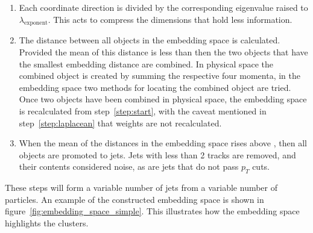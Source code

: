 \begin{enumerate}
    \item \label{step:compression} Each coordinate direction is divided by the corresponding eigenvalue raised to \(\lambda_\text{exponent}\).
            This acts to compress the dimensions that hold less information.

        \item \label{step:stoppingcondition} The distance between all objects in the embedding space is calculated.
            Provided the mean of this distance is less than \stoppingdeltar{} then
        the two objects that have the smallest embedding distance are combined.
        In physical space the combined object is created by summing the respective four momenta,
        in the embedding space two methods for locating the combined object are tried.
        Once two objects have been combined in physical space, the embedding space is recalculated from step~\ref{step:start},
        with the caveat mentioned in step~\ref{step:laplacean} that weights are not recalculated.


    \item When the mean of the distances in the embedding space rises above \stoppingdeltar{},
        then all objects are promoted to jets. Jets with less than 2 tracks are removed,
        and their contents considered noise,
        as are jets that do not pass \(p_T\) cuts.
    \end{enumerate}

    These steps will form a variable number of jets from a variable number of particles.
    An example of the constructed embedding space is shown in figure~\ref{fig:embedding_space_simple}.
    This illustrates how the embedding space highlights the clusters.

